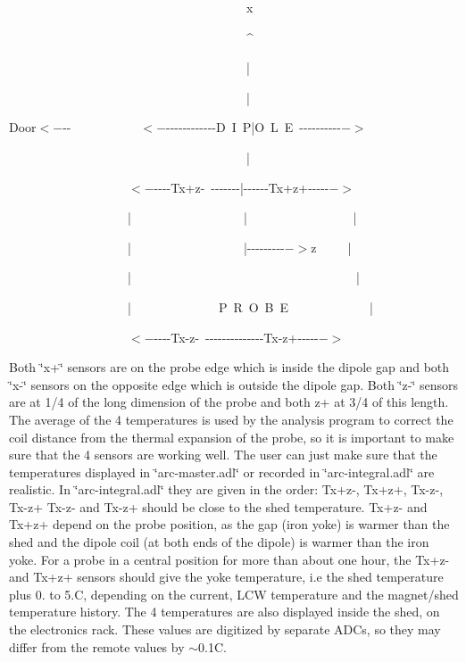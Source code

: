 \begin{lyxcode}
~~~~~~~~~~~~~~~~~~~~~~~~~~~~~~~~~~~~~~x~

~~~~~~~~~~~~~~~~~~~~~~~~~~~~~~~~~~~~~~\^{}~

~~~~~~~~~~~~~~~~~~~~~~~~~~~~~~~~~~~~~~|~

~~~~~~~~~~~~~~~~~~~~~~~~~~~~~~~~~~~~~~|~

Door$< -${}-{}-~~~~~~~~~~~$< -${}-{}-{}-{}-{}-{}-{}-{}-{}-{}-{}-{}-D~I~P|O~L~E~-{}-{}-{}-{}-{}-{}-{}-{}-{}-{}$->$~

~~~~~~~~~~~~~~~~~~~~~~~~~~~~~~~~~~~~~~|~

~~~~~~~~~~~~~~~~~~~$< -${}-{}-{}-{}-Tx+z-~-{}-{}-{}-{}-{}-{}-|-{}-{}-{}-{}-{}-Tx+z+-{}-{}-{}-{}-{}$->$~

~~~~~~~~~~~~~~~~~~~|~~~~~~~~~~~~~~~~~~|~~~~~~~~~~~~~~~~~|~

~~~~~~~~~~~~~~~~~~~|~~~~~~~~~~~~~~~~~~|-{}-{}-{}-{}-{}-{}-{}-{}-{}$->$z~~~~~|~

~~~~~~~~~~~~~~~~~~~|~~~~~~~~~~~~~~~~~~~~~~~~~~~~~~~~~~~~|~

~~~~~~~~~~~~~~~~~~~|~~~~~~~~~~~~~~P~R~O~B~E~~~~~~~~~~~~~|~

~~~~~~~~~~~~~~~~~~~$< -${}-{}-{}-{}-Tx-z-~-{}-{}-{}-{}-{}-{}-{}-{}-{}-{}-{}-{}-{}-Tx-z+-{}-{}-{}-{}-{}$->$
\end{lyxcode}

Both \char`\"{}x+\char`\"{} sensors are on the probe edge which is inside the
dipole gap and both \char`\"{}x-\char`\"{} sensors on the opposite edge which
is outside the dipole gap. Both \char`\"{}z-\char`\"{} sensors are at 1/4 of
the long dimension of the probe and both z+ at 3/4 of this length. The average
of the 4 temperatures is used by the analysis program to correct the coil distance
from the thermal expansion of the probe, so it is important to make sure that
the 4 sensors are working well. The user can just make sure that the temperatures
displayed in \char`\"{}arc-master.adl\char`\"{} or recorded in \char`\"{}arc-integral.adl\char`\"{}
are realistic. In \char`\"{}arc-integral.adl\char`\"{} they are given in the
order: Tx+z-, Tx+z+, Tx-z-, Tx-z+ Tx-z- and Tx-z+ should be close to the shed
temperature. Tx+z- and Tx+z+ depend on the probe position, as the gap (iron
yoke) is warmer than the shed and the dipole coil (at both ends of the dipole)
is warmer than the iron yoke. For a probe in a central position for more than
about one hour, the Tx+z- and Tx+z+ sensors should give the yoke temperature,
i.e the shed temperature plus 0. to 5.C, depending on the current, LCW temperature
and the magnet/shed temperature history. The 4 temperatures are also displayed
inside the shed, on the electronics rack. These values are digitized by separate
ADCs, so they may differ from the remote values by \( \sim  \)0.1C. 


